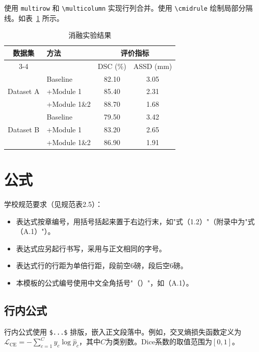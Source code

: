 使用 \verb|multirow| 和 \verb|\multicolumn| 实现行列合并。使用 \verb|\cmidrule| 绘制局部分隔线。如表~\ref{tab:demo-multirow} 所示。

\begin{table}[htbp]
  \centering
  \caption{消融实验结果}
  \label{tab:demo-multirow}
  \begin{tabular}{clcc}
    \toprule
    \multirow{2}{*}{数据集} & \multirow{2}{*}{方法} & \multicolumn{2}{c}{评价指标} \\
    \cmidrule(lr){3-4}
     & & DSC (\%) & ASSD (mm) \\
    \midrule
    \multirow{3}{*}{Dataset A} & Baseline & 82.10 & 3.05 \\
     & +Module 1 & 85.40 & 2.31 \\
     & +Module 1\&2 & 88.70 & 1.68 \\
    \midrule
    \multirow{3}{*}{Dataset B} & Baseline & 79.50 & 3.42 \\
     & +Module 1 & 83.20 & 2.65 \\
     & +Module 1\&2 & 86.90 & 1.91 \\
    \bottomrule
  \end{tabular}
\end{table}

\section{公式}\label{sec:demo-equations}

学校规范要求（见规范表2.5）：

\begin{itemize}
  \item 表达式按章编号，用括号括起来置于右边行末，如"式（1.2）"（附录中为"式（A.1）"）。
  \item 表达式应另起行书写，采用与正文相同的字号。
  \item 表达式行的行距为单倍行距，段前空6磅，段后空6磅。
  \item 本模板的公式编号使用中文全角括号"（）"，如（A.1）。
\end{itemize}

\subsection{行内公式}\label{subsec:demo-inline-eq}

行内公式使用 \verb|$...$| 排版，嵌入正文段落中。例如，交叉熵损失函数定义为$\mathcal{L}_{\text{CE}} = -\sum_{c=1}^{C} y_c \log \hat{p}_c$，其中$C$为类别数。Dice系数的取值范围为$[0, 1]$。

